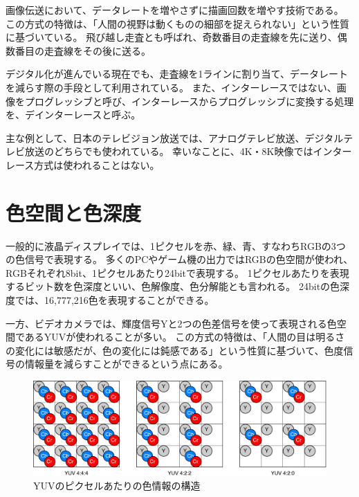 画像伝送において、データレートを増やさずに描画回数を増やす技術である。
この方式の特徴は、「人間の視野は動くものの細部を捉えられない」という性質に基づいている。
飛び越し走査とも呼ばれ、奇数番目の走査線を先に送り、偶数番目の走査線をその後に送る。

デジタル化が進んでいる現在でも、走査線を1ラインに割り当て、データレートを減らす際の手段として利用されている。
また、インターレースではない、画像をプログレッシブと呼び、インターレースからプログレッシブに変換する処理を、デインターレースと呼ぶ。

主な例として、日本のテレビジョン放送では、アナログテレビ放送、デジタルテレビ放送のどちらでも使われている。
幸いなことに、4K・8K映像ではインターレース方式は使われることはない。%

\section{色空間と色深度}
\label{sec:colorspace}

一般的に液晶ディスプレイでは、1ピクセルを赤、緑、青、すなわちRGBの3つの色信号で表現する。
多くのPCやゲーム機の出力ではRGBの色空間が使われ、RGBそれぞれ8bit、1ピクセルあたり24bitで表現する。
1ピクセルあたりを表現するビット数を色深度といい、色解像度、色分解能とも言われる。
24bitの色深度では、16,777,216色を表現することができる。

一方、ビデオカメラでは、輝度信号Yと2つの色差信号を使って表現される色空間であるYUVが使われることが多い。%
この方式の特徴は、「人間の目は明るさの変化には敏感だが、色の変化には鈍感である」という性質に基づいて、色度信号の情報量を減らすことができるという点にある。

\begin{figure}[htbp]
  \begin{center}
    \includegraphics[bb=0 0 681 222,width=14cm]{img/yuv-pixel-structure.pdf}
  \end{center}
  \caption{YUVのピクセルあたりの色情報の構造}
  \label{fig:yuv-pixel-structure}
\end{figure}

